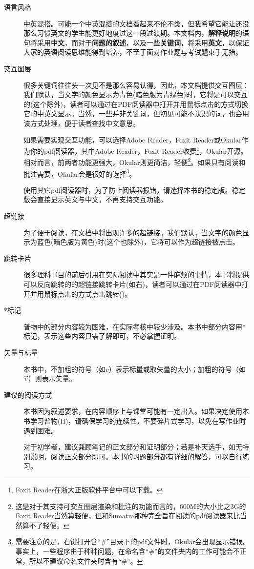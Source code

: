 	\begin{description}
		\item[语言风格]中英混搭。可能一个中英混搭的文档看起来不伦不类，但我希望它能让还没那么习惯英文的学生能更好地度过这一段过渡期。本文档内，\textbf{解释说明}的语句将采用\textbf{中文}，而对于\textbf{问题的叙述}，以及一些\textbf{关键词}，将采用\textbf{英文}，以保证大家的英语阅读思维能得到培养，不至于面对作业题与考试题束手无措。
		\item[交互图层] 很多关键词往往头一次见不是那么容易认得，因此，本文档提供交互图层：我们默认，当文字的颜色显示为{\color{plaincyan}青色(暗色版为青绿色)}时，它将是可以交互的(这个除外)，读者可以通过在PDF阅读器中打开并用鼠标点击的方式切换它的中英文显示。当然，一些并非关键词，但初见可能不认识的词，也会用该方式处理，便于读者查找中文意思。
		
		如果需要实现交互功能，可以选择Adobe Reader，Foxit Reader或Okular作为你的pdf阅读器，其中Adobe Reader，Foxit Reader收费\footnote{Foxit Reader在浙大正版软件平台中可以下载。}，Okular开源。相对而言，前两者功能更强大，Okular则更简洁，轻便\footnote{这是对于其支持可交互图层渲染和批注的功能而言的，600M的大小比之3G的Foxit Reader当然算轻便，但和Sumatra那种完全旨在阅读的pdf阅读器来比当然算不了轻便。}。如果只有阅读和批注需要，Okular会是很好的选择\footnote{需要注意的是，右键打开含``\#''目录下的pdf文件时，Okular会出现显示错误。事实上，一些程序由于种种问题，在命名含``\#''的文件夹内的工作可能会不正常，所以不建议命名文件夹时含有``\#''。}。
		
		使用其它pdf阅读器时，为了防止阅读器报错，请选择本书的稳定版。稳定版会直接显示英文与中文，不再支持交互功能。
		
		\item[超链接]为了便于阅读，在文档中将出现许多的超链接。我们默认，当文字的颜色显示为{\color{thisblue}蓝色(暗色版为黄色)}时(这个也除外)，它将可以作为超链接被点击。
		\item[跳转卡片]很多理科书目的前后引用在实际阅读中其实是一件麻烦的事情，本书将提供可以反向跳转的的超链接跳转卡片(如右)，读者可以通过在PDF阅读器中打开并用鼠标点击的方式点击跳转()。
		\item[*标记]普物中的部分内容较为困难，在实际考核中较少涉及。本书中部分内容用*标记，表示这些内容只需了解即可，不必掌握证明。
		\item [矢量与标量]本书中，不加粗的符号（如$v$）表示标量或取矢量的大小；加粗的符号（如$\vec{v}$）则表示矢量。
		\item [建议的阅读方式] 本书因为叙述要求，在内容顺序上与课堂可能有一定出入。如果决定使用本书学习普物(H)，请确保学习的连续性，不要碎片式学习，以免在写作业时遇到困难。
		
		对于初学者，建议兼顾笔记的正文部分和证明部分；若是补天选手，如无特别说明，阅读正文部分即可。本书的习题部分都有详细的解答，可以自行练习。
	\end{description}
